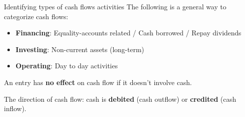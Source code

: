 \begin{theorem}
    {Identifying types of cash flows activities}
    The following is a general way to categorize cash flows:
    \begin{itemize}
        \item \textbf{Financing}: Equality-accounts related / Cash borrowed / Repay dividends
        \item \textbf{Investing}: Non-current assets (long-term)
        \item \textbf{Operating}: Day to day activities
    \end{itemize}
    An entry has \textbf{no effect} on cash flow if it doesn't involve cash.

    The direction of cash flow: cash is \textbf{debited} (cash outflow) or \textbf{credited} (cash inflow).
\end{theorem}

\newpage
